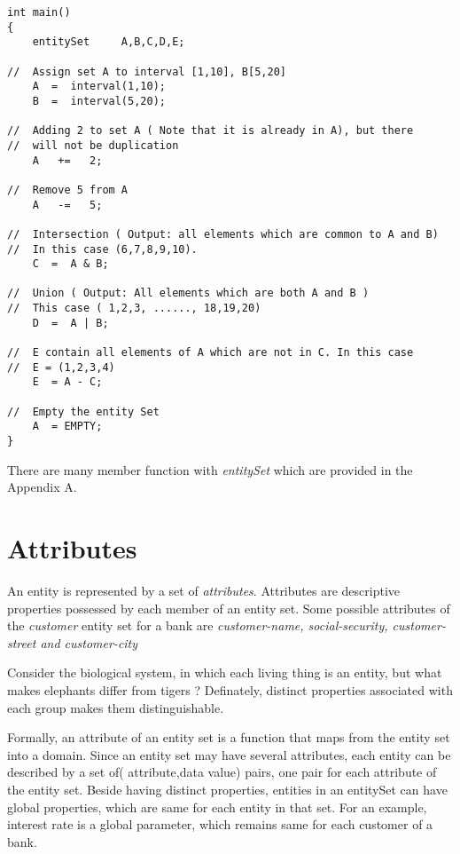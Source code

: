 \begin{verbatim}
int main()
{
    entitySet     A,B,C,D,E;

//  Assign set A to interval [1,10], B[5,20]
    A  =  interval(1,10);
    B  =  interval(5,20);

//  Adding 2 to set A ( Note that it is already in A), but there
//  will not be duplication    
    A   +=   2;

//  Remove 5 from A
    A   -=   5;

//  Intersection ( Output: all elements which are common to A and B)
//  In this case (6,7,8,9,10).
    C  =  A & B;

//  Union ( Output: All elements which are both A and B )
//  This case ( 1,2,3, ......, 18,19,20)
    D  =  A | B;

//  E contain all elements of A which are not in C. In this case
//  E = (1,2,3,4)
    E  = A - C;

//  Empty the entity Set
    A  = EMPTY;
}
\end{verbatim}
\par There are many member function with {\em entitySet} which are provided in the
Appendix A.

\section { Attributes }
An entity is represented by a set of {\em attributes}. Attributes are descriptive
properties possessed by each member of an entity set.  Some possible attributes
of the {\em customer } entity set for a bank are {\em customer-name, 
social-security, customer-street and customer-city }

\par Consider the biological system, in which each living thing is an entity,
but what makes elephants differ from tigers ? Definately, distinct properties
associated with each group makes them distinguishable. 

%
\par Formally, an attribute of an entity set is a function that maps from the entity
set into a domain. Since an entity set may have several attributes, each entity
can be described by a set of( attribute,data value) pairs, one pair for 
each attribute of the entity set. 
%
Beside having distinct properties, entities in an entitySet can have global
properties, which are same for each entity in that set. For an example, 
interest rate is a global parameter, which remains same for each customer
of a bank. 

